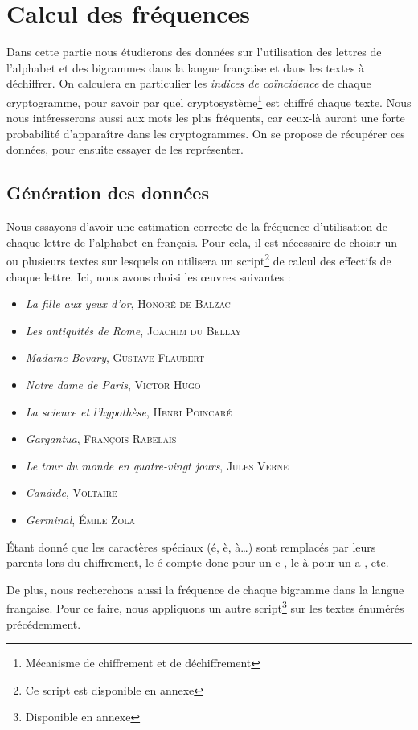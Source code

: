 \documentclass[a4paper, titlepage]{livret}
\begin{document}
\chapter{Calcul des fréquences}
Dans cette partie nous étudierons des données sur l'utilisation des lettres de l'alphabet et des bigrammes dans la langue française et dans les textes à déchiffrer.
On calculera en particulier les \emph{indices de coïncidence} de chaque cryptogramme, pour savoir par quel cryptosystème\footnote{Mécanisme de chiffrement et de déchiffrement} est chiffré chaque texte.
Nous nous intéresserons aussi aux mots les plus fréquents, car ceux-là auront une forte probabilité d'apparaître dans les cryptogrammes.
On se propose de récupérer ces données, pour ensuite essayer de les représenter.

\section{Génération des données}
Nous essayons d'avoir une estimation correcte de la fréquence d'utilisation de chaque lettre de l'alphabet en français.
Pour cela, il est nécessaire de choisir un ou plusieurs textes sur lesquels on utilisera un script\footnote{Ce script est disponible en annexe} de calcul des effectifs de chaque lettre.
Ici, nous avons choisi les \oe{}uvres suivantes :
\begin{itemize}
\item \emph{La fille aux yeux d'or}, \textsc{Honoré de Balzac}
\item \emph{Les antiquités de Rome}, \textsc{Joachim du Bellay}
\item \emph{Madame Bovary}, \textsc{Gustave Flaubert}
\item \emph{Notre dame de Paris}, \textsc{Victor Hugo}
\item \emph{La science et l'hypothèse}, \textsc{Henri Poincaré}
\item \emph{Gargantua}, \textsc{François Rabelais}
\item \emph{Le tour du monde en quatre-vingt jours}, \textsc{Jules Verne}
\item \emph{Candide}, \textsc{Voltaire}
\item \emph{Germinal}, \textsc{Émile Zola}
\end{itemize} 
Étant donné que les caractères spéciaux (é, è, à…) sont remplacés par leurs parents lors du chiffrement, le \og é \fg{} compte donc pour un \og e \fg{}, le \og à \fg{} pour un \og a \fg{}, etc.

De plus, nous recherchons aussi la fréquence de chaque bigramme dans la langue française. 
Pour ce faire, nous appliquons un autre script\footnote{Disponible en annexe} sur les textes énumérés précédemment.
\end{document}
